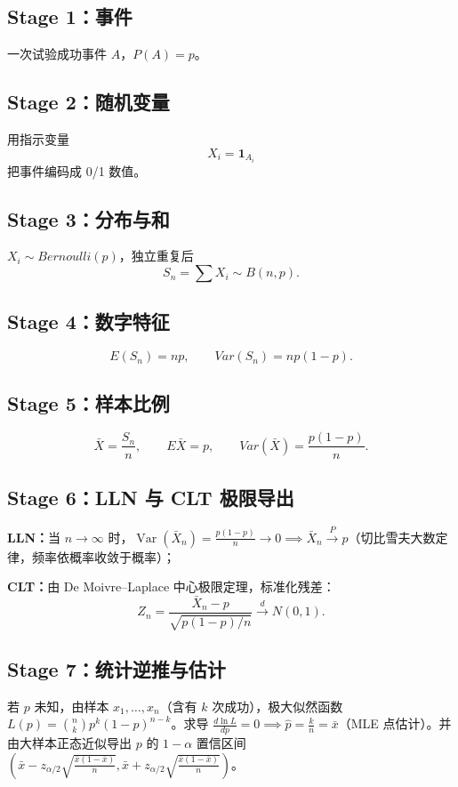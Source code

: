\documentclass[11pt,a4paper,openany]{ctexbook}
\newcommand{\key}[1]{\textbf{\color{deep}#1}}
\begin{document}
\subsection{Stage 1：事件}
一次试验成功事件 $A$，$P(A)=p$。

\subsection{Stage 2：随机变量}
用指示变量
\[
X_i=\mathbf 1_{A_i}
\]
把事件编码成 0/1 数值。

\subsection{Stage 3：分布与和}
$X_i\sim Bernoulli(p)$，独立重复后
\[
S_n=\sum X_i\sim B(n,p).
\]

\subsection{Stage 4：数字特征}
\[
E(S_n)=np,\qquad Var(S_n)=np(1-p).
\]

\subsection{Stage 5：样本比例}
\[
\bar X=\frac{S_n}{n},\qquad E\bar X=p,\qquad Var(\bar X)=\frac{p(1-p)}{n}.
\]

\subsection{Stage 6：LLN 与 CLT 极限导出}
\key{LLN：}当 $n \to \infty$ 时，$\operatorname{Var}(\bar X_n) = \frac{p(1-p)}{n} \to 0 \implies \bar X_n \xrightarrow{P} p$（切比雪夫大数定律，频率依概率收敛于概率）；

\key{CLT：}由 De Moivre--Laplace 中心极限定理，标准化残差：
\[
Z_n = \frac{\bar X_n - p}{\sqrt{p(1-p)/n}} \xrightarrow{d} N(0,1).
\]

\subsection{Stage 7：统计逆推与估计}
若 $p$ 未知，由样本 $x_1,\dots,x_n$（含有 $k$ 次成功），极大似然函数 $L(p) = \binom{n}{k}p^k(1-p)^{n-k}$。求导 $\frac{d\ln L}{dp} = 0 \implies \hat p = \frac{k}{n} = \bar x$（MLE 点估计）。并由大样本正态近似导出 $p$ 的 $1-\alpha$ 置信区间 $\left( \bar x - z_{\alpha/2}\sqrt{\frac{\bar x(1-\bar x)}{n}}, \bar x + z_{\alpha/2}\sqrt{\frac{\bar x(1-\bar x)}{n}} \right)$。
\end{document}
